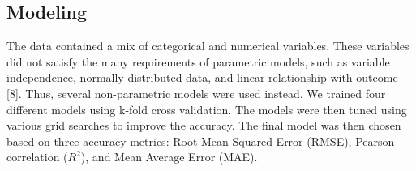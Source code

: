 \documentclass[11pt,]{article}
\begin{document}
\hypertarget{modeling}{%
\subsection{Modeling}\label{modeling}}

The data contained a mix of categorical and numerical variables. These
variables did not satisfy the many requirements of parametric models,
such as variable independence, normally distributed data, and linear
relationship with outcome {[}8{]}. Thus, several non-parametric models
were used instead. We trained four different models using k-fold cross
validation. The models were then tuned using various grid searches to
improve the accuracy. The final model was then chosen based on three
accuracy metrics: Root Mean-Squared Error (RMSE), Pearson correlation
(\(R^2\)), and Mean Average Error (MAE).
\end{document}
